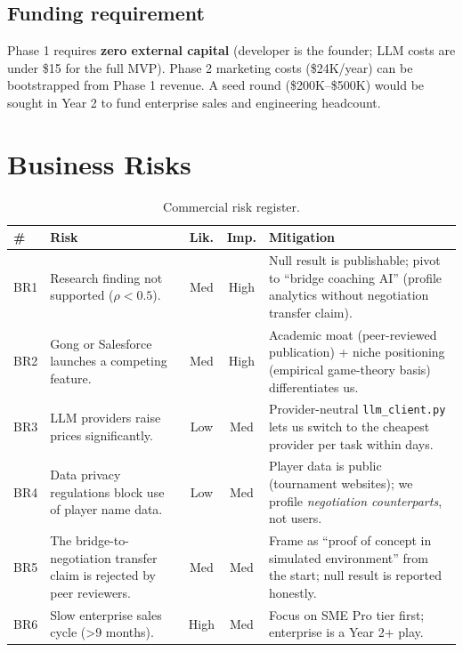 \documentclass[11pt, a4paper, oneside]{report}
\begin{document}
\section{Funding requirement}

Phase 1 requires \textbf{zero external capital} (developer is the founder;
LLM costs are under \$15 for the full MVP). Phase 2 marketing costs
(\$24K/year) can be bootstrapped from Phase 1 revenue. A seed round
(\$200K--\$500K) would be sought in Year 2 to fund enterprise sales and
engineering headcount.

\chapter{Business Risks}
\label{ch:bizrisks}

\begin{table}[H]
\centering\small
\caption{Commercial risk register.}
\begin{tabularx}{\textwidth}{p{0.5cm} X c c X}
\toprule
\textbf{\#} & \textbf{Risk} & \textbf{Lik.} & \textbf{Imp.} & \textbf{Mitigation} \\
\midrule
BR1 & Research finding not supported ($\rho < 0.5$).
    & Med & High
    & Null result is publishable; pivot to ``bridge coaching AI'' (profile
      analytics without negotiation transfer claim). \\
BR2 & Gong or Salesforce launches a competing feature.
    & Med & High
    & Academic moat (peer-reviewed publication) + niche positioning
      (empirical game-theory basis) differentiates us. \\
BR3 & LLM providers raise prices significantly.
    & Low & Med
    & Provider-neutral \texttt{llm\_client.py} lets us switch to the
      cheapest provider per task within days. \\
BR4 & Data privacy regulations block use of player name data.
    & Low & Med
    & Player data is public (tournament websites); we profile
      \emph{negotiation counterparts}, not users. \\
BR5 & The bridge-to-negotiation transfer claim is rejected by peer reviewers.
    & Med & Med
    & Frame as ``proof of concept in simulated environment'' from the start;
      null result is reported honestly. \\
BR6 & Slow enterprise sales cycle (\textgreater 9 months).
    & High & Med
    & Focus on SME Pro tier first; enterprise is a Year 2+ play. \\
\bottomrule
\end{tabularx}
\end{table}
\end{document}
